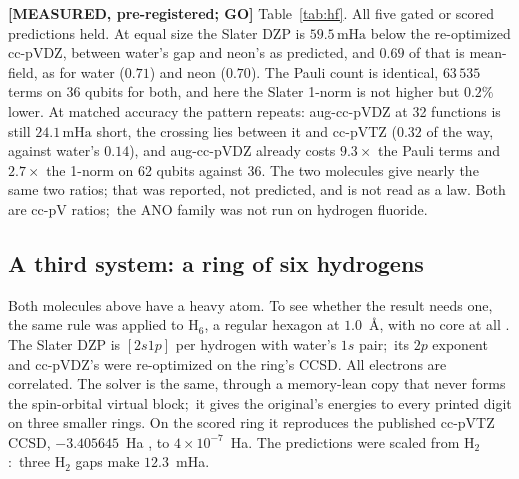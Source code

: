 \documentclass[aps,pra,twocolumn,superscriptaddress,longbibliography]{revtex4-2}
\newcommand{\gvq}[2]{#2}
\newcommand{\mHa}{\,\mathrm{mHa}}
\begin{document}
\textbf{[MEASURED, pre-registered; GO]}  Table~\ref{tab:hf}.  All five
gated or scored predictions held.  At equal size the Slater DZP is
$\gvq{p62_hf_dzp_vs_ccpvdz_mha}{59.5}\mHa$ below the re-optimized
cc-pVDZ, between water's gap and neon's as predicted, and
$\gvq{p62_hf_scf_share}{0.69}$ of that is mean-field, as for water
($0.71$) and neon ($0.70$).  The Pauli count is identical,
$\gvq{p62_hf_pauli_fc}{63\,535}$ terms on 36 qubits for both, and here
the Slater 1-norm is not higher but $0.2\%$ lower.  At matched accuracy
the pattern repeats: aug-cc-pVDZ at 32 functions is still
$\gvq{p62_hf_aug_above_dzp_mha}{24.1}\mHa$ short, the crossing lies
between it and cc-pVTZ ($0.32$ of the way, against water's $0.14$), and
aug-cc-pVDZ already costs $\gvq{p62_hf_aug_pauli_ratio}{9.3}\times$ the
Pauli terms and $\gvq{p62_hf_aug_lambda_ratio}{2.7}\times$ the 1-norm on
62 qubits against 36.  The two molecules give nearly the same two
ratios; that was reported, not predicted, and is not read as a law.
Both are cc-pV ratios;\ the ANO family was not run on hydrogen fluoride.

\subsection{A third system: a ring of six hydrogens}
\label{sec:hring}

Both molecules above have a heavy atom.  To see whether the result needs
one, the same rule was applied to H$_6$, a regular hexagon at $1.0$~\AA,
with no core at all \cite{hr_record}.  The Slater DZP is $[2s1p]$ per
hydrogen with water's $1s$ pair;\ its $2p$ exponent and cc-pVDZ's were
re-optimized on the ring's CCSD.  All electrons are correlated.  The
solver is the same, through a memory-lean copy that never forms the
spin-orbital virtual block;\ it gives the original's energies to every
printed digit on three smaller rings.  On the scored ring it reproduces
the published cc-pVTZ CCSD, $-3.405645$~Ha \cite{magoulas2022}, to
$4\times10^{-7}$~Ha.  The predictions were scaled from H$_2$:\ three H$_2$
gaps make $12.3$~mHa.
\end{document}
